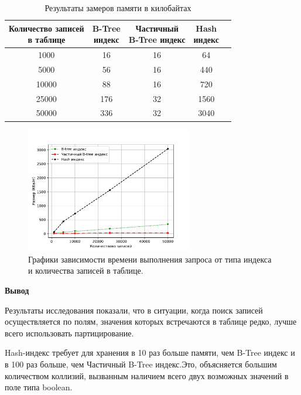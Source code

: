 \begin{table}[H]
	\begin{center}
		\begin{center}
			\caption{\label{tab:memIdx}Результаты замеров памяти в килобайтах}
		\end{center}
		\begin{tabular}{|c|c|c|c|c|}
			\hline 
			\specialcell{Количество записей\\ в таблице} & \specialcell{B-Tree \\индекс} & \specialcell{Частичный \\B-Tree индекс} & \specialcell{Hash\\ индекс}  \\\hline
		1000   & 		16 & 16 & 		64  \\ \hline
		5000   & 		56 & 16 & 		440  \\ \hline
		10000  & 		88 & 16 & 		720  \\ \hline
		25000  & 		176 & 32 & 		1560  \\ \hline
		50000  & 		336 & 32 & 		3040  \\ \hline

		\end{tabular}
	\end{center}
\end{table}

\begin{figure}[h]
	\centering
	\includegraphics[width=0.65\textwidth, height=0.32\textheight]{research/mem}
	\caption{Графики зависимости времени выполнения запроса от типа индекса и количества записей в таблице.}
	\label{fig:memIdx}
\end{figure}

\textbf{Вывод}

Результаты исследования показали, что в ситуации, когда поиск записей осуществляется по полям, значения которых встречаются в таблице редко, лучше всего использовать партицирование.

Hash-индекс требует для хранения в 10 раз больше памяти, чем B-Tree индекс и в 100 раз больше, чем Частичный B-Tree индекс.Это, объясняется большим количеством коллизий, вызванным наличием всего двух возможных значений в поле типа boolean.
